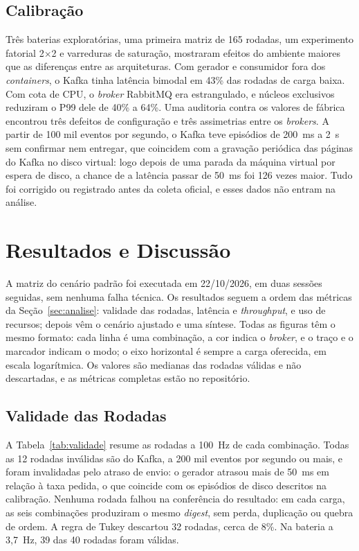 \documentclass[12pt]{article}
\begin{document}
\subsection{Calibração}
\label{sec:calibracao}

Três baterias exploratórias, uma primeira matriz de 165 rodadas, um experimento fatorial
2$\times$2 e varreduras de saturação, mostraram efeitos do ambiente maiores que as
diferenças entre as arquiteturas. Com gerador e consumidor fora dos \textit{containers}, o Kafka
tinha latência bimodal em 43\% das rodadas de carga baixa. Com cota de CPU, o \textit{broker}
RabbitMQ era estrangulado, e núcleos exclusivos reduziram o P99 dele de 40\% a 64\%. Uma
auditoria contra os valores de fábrica encontrou três defeitos de configuração e três
assimetrias entre os \textit{brokers}. A partir de 100 mil eventos por segundo, o Kafka teve
episódios de 200~ms a 2~s sem confirmar nem entregar, que coincidem com a gravação
periódica das páginas do Kafka no disco virtual: logo depois de uma parada da máquina
virtual por espera de disco, a chance de a latência passar de 50~ms foi 126 vezes maior.
Tudo foi corrigido ou registrado antes da coleta oficial, e esses dados não entram na
análise.


\section{Resultados e Discussão}
\label{sec:resultados}

A matriz do cenário padrão foi executada em 22/10/2026, em duas sessões seguidas, sem
nenhuma falha técnica. Os resultados seguem a ordem das métricas da
Seção~\ref{sec:analise}: validade das rodadas, latência e \textit{throughput}, e uso de recursos;
depois vêm o cenário ajustado e uma síntese. Todas as figuras têm o mesmo formato: cada
linha é uma combinação, a cor indica o \textit{broker}, e o traço e o marcador indicam o modo; o
eixo horizontal é sempre a carga oferecida, em escala logarítmica. Os valores são medianas
das rodadas válidas e não descartadas, e as métricas completas estão no repositório.

\subsection{Validade das Rodadas}

A Tabela~\ref{tab:validade} resume as rodadas a 100~Hz de cada combinação. Todas as 12
rodadas inválidas são do Kafka, a 200 mil eventos por segundo ou mais, e foram invalidadas
pelo atraso de envio: o gerador atrasou mais de 50~ms em relação à taxa pedida, o que
coincide com os episódios de disco descritos na calibração. Nenhuma rodada falhou na
conferência do resultado: em cada carga, as seis combinações produziram o mesmo \textit{digest},
sem perda, duplicação ou quebra de ordem. A regra de Tukey descartou 32 rodadas, cerca de
8\%. Na bateria a 3,7~Hz, 39 das 40 rodadas foram válidas.
\end{document}
